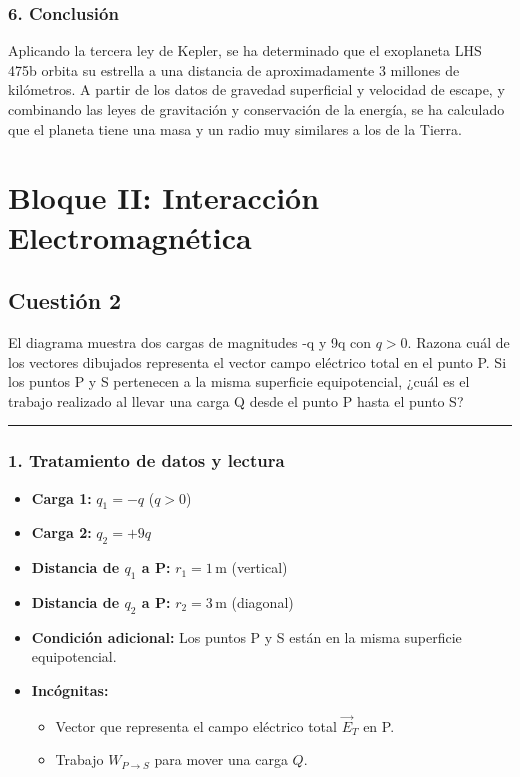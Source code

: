 \subsubsection*{6. Conclusión}
\begin{cajaconclusion}
Aplicando la tercera ley de Kepler, se ha determinado que el exoplaneta LHS 475b orbita su estrella a una distancia de aproximadamente 3 millones de kilómetros. A partir de los datos de gravedad superficial y velocidad de escape, y combinando las leyes de gravitación y conservación de la energía, se ha calculado que el planeta tiene una masa y un radio muy similares a los de la Tierra.
\end{cajaconclusion}

\newpage

\section{Bloque II: Interacción Electromagnética}
\label{sec:em_2023_jul_ord}

\subsection{Cuestión 2}
\label{subsec:C2_2023_jul_ord}

\begin{cajaenunciado}
El diagrama muestra dos cargas de magnitudes -q y 9q con $q>0$. Razona cuál de los vectores dibujados representa el vector campo eléctrico total en el punto P. Si los puntos P y S pertenecen a la misma superficie equipotencial, ¿cuál es el trabajo realizado al llevar una carga Q desde el punto P hasta el punto S?
\end{cajaenunciado}
\hrule

\subsubsection*{1. Tratamiento de datos y lectura}
\begin{itemize}
    \item \textbf{Carga 1:} $q_1 = -q$ ($q>0$)
    \item \textbf{Carga 2:} $q_2 = +9q$
    \item \textbf{Distancia de $q_1$ a P:} $r_1 = 1 \, \text{m}$ (vertical)
    \item \textbf{Distancia de $q_2$ a P:} $r_2 = 3 \, \text{m}$ (diagonal)
    \item \textbf{Condición adicional:} Los puntos P y S están en la misma superficie equipotencial.
    \item \textbf{Incógnitas:}
    \begin{itemize}
        \item Vector que representa el campo eléctrico total $\vec{E}_T$ en P.
        \item Trabajo $W_{P \to S}$ para mover una carga $Q$.
    \end{itemize}
\end{itemize}

